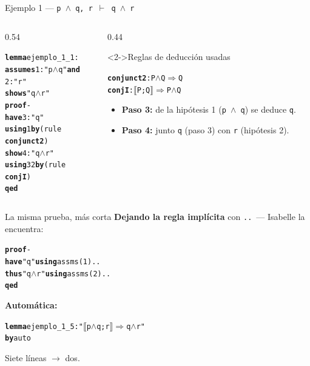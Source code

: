 \documentclass[11pt,aspectratio=169]{beamer}
\newcommand{\sAnd}{\(\wedge\)}
\newcommand{\sMeta}{\(\Longrightarrow\)}
\newcommand{\sTurn}{\(\vdash\)}
\newcommand{\sLb}{\(\llbracket\)}
\newcommand{\sRb}{\(\rrbracket\)}
\newcommand{\kw}[1]{\textcolor{isaCmd}{\textbf{#1}}}
\newcommand{\str}[1]{\textcolor{isaStr}{#1}}
\newcommand{\Rn}[1]{\textcolor{granate}{\textbf{#1}}}
\newcommand{\R}[1]{{\setlength{\fboxsep}{1pt}%
  \colorbox{resalte}{\ttfamily\bfseries\textcolor{granate}{#1}}}}
\begin{document}
\begin{frame}[fragile]{Ejemplo 1 --- \texttt{p \sAnd{} q, r \sTurn{} q \sAnd{} r}}
  \begin{columns}[T]
    \begin{column}{0.54\textwidth}
\begin{alltt}\footnotesize
\kw{lemma} ejemplo_1_1:
  \kw{assumes} 1: \str{"p \sAnd{} q"} \kw{and}
          2: \str{"r"}
  \kw{shows} \str{"q \sAnd{} r"}
\kw{proof} -
  \kw{have} 3: \str{"q"}
    \kw{using} 1 \kw{by} (rule \R{conjunct2})
  \kw{show} 4: \str{"q \sAnd{} r"}
    \kw{using} 3 2 \kw{by} (rule \R{conjI})
\kw{qed}
\end{alltt}
    \end{column}
    \begin{column}{0.44\textwidth}
      \begin{block}<2->{Reglas de deducción usadas}
\begin{alltt}\scriptsize
\Rn{conjunct2}: P \sAnd{} Q \sMeta{} Q
\Rn{conjI}: \sLb{}P; Q\sRb{} \sMeta{} P \sAnd{} Q
\end{alltt}
\end{block}
      \footnotesize
      \begin{itemize}
        \item<3-> \textbf{Paso 3:} de la hipótesis 1
          (\texttt{p \sAnd{} q}) se deduce \texttt{q}.
        \item<4-> \textbf{Paso 4:} junto \texttt{q} (paso 3) con
          \texttt{r} (hipótesis 2).
      \end{itemize}
    \end{column}
  \end{columns}
\end{frame}

\begin{frame}[fragile]{La misma prueba, más corta}
  \textbf{Dejando la regla implícita} con \texttt{..}\ --- Isabelle la
  encuentra:
\begin{alltt}\footnotesize
\kw{proof} -
  \kw{have} \str{"q"} \kw{using} assms(1) ..
  \kw{thus} \str{"q \sAnd{} r"} \kw{using} assms(2) ..
\kw{qed}
\end{alltt}
  
  \textbf{Automática:}
\begin{alltt}\footnotesize
\kw{lemma} ejemplo_1_5: \str{"\sLb{}p \sAnd{} q; r\sRb{} \sMeta{} q \sAnd{} r"}
\kw{by} auto
\end{alltt}
  \vspace{0.4em}
  
  \begin{center}
    \alert{Siete líneas $\longrightarrow$ dos.}\\
  \end{center}
\end{frame}
\end{document}
